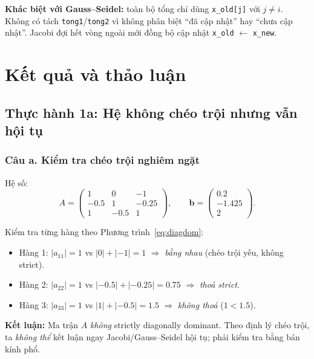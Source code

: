 \documentclass[12pt,a4paper]{article}
\begin{document}
\textbf{Khác biệt với Gauss--Seidel:} toàn bộ tổng chỉ dùng \texttt{x\_old[j]} với $j\ne i$. Không có tách \texttt{tong1}/\texttt{tong2} vì không phân biệt ``đã cập nhật'' hay ``chưa cập nhật''. Jacobi đợi hết vòng ngoài mới đồng bộ cập nhật \texttt{x\_old} $\leftarrow$ \texttt{x\_new}.

\section{Kết quả và thảo luận}

\subsection{Thực hành 1a: Hệ không chéo trội nhưng vẫn hội tụ}

\subsubsection{Câu a. Kiểm tra chéo trội nghiêm ngặt}

Hệ số:
\[
    A = \begin{pmatrix}
        1 & 0 & -1 \\
        -0.5 & 1 & -0.25 \\
        1 & -0.5 & 1
    \end{pmatrix}, \qquad
    \mathbf{b} = \begin{pmatrix} 0.2 \\ -1.425 \\ 2 \end{pmatrix}.
\]

Kiểm tra từng hàng theo Phương trình~\eqref{eq:diagdom}:
\begin{itemize}
    \item Hàng 1: $|a_{11}| = 1$ vs $|0| + |-1| = 1$ $\Longrightarrow$ \emph{bằng nhau} (chéo trội yếu, không strict).
    \item Hàng 2: $|a_{22}| = 1$ vs $|-0.5| + |-0.25| = 0.75$ $\Longrightarrow$ \emph{thoả strict}.
    \item Hàng 3: $|a_{33}| = 1$ vs $|1| + |-0.5| = 1.5$ $\Longrightarrow$ \emph{không thoả} ($1 < 1.5$).
\end{itemize}

\textbf{Kết luận:} Ma trận $A$ \emph{không} strictly diagonally dominant. Theo định lý chéo trội, ta \emph{không thể} kết luận ngay Jacobi/Gauss--Seidel hội tụ; phải kiểm tra bằng bán kính phổ.
\end{document}
